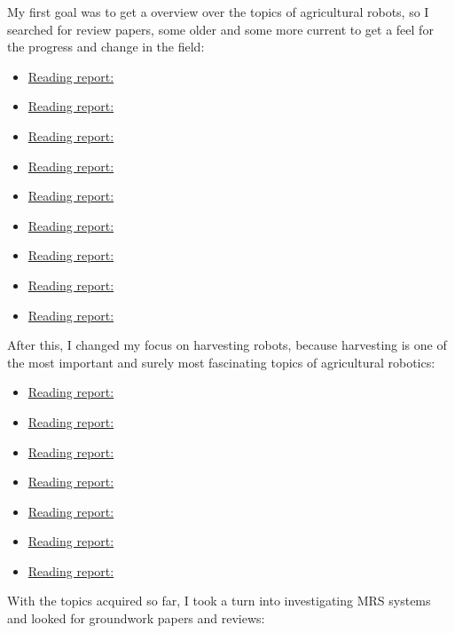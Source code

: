    My first goal was to get a overview over the topics of agricultural robots, so I searched for review papers, some older and some more current to get a feel for the progress and change in the field: 
    \begin{itemize}
        \item \hyperref[sec:Bac2014]{Reading report:} \cite{Bac2014}
        \item \hyperref[sec:Bechar2016]{Reading report:} \cite{Bechar2016}
        \item \hyperref[sec:Davidson2020]{Reading report:} \cite{Davidson2020}
        \item \hyperref[sec:Haidegger2013]{Reading report:} \cite{Haidegger2013}
        \item \hyperref[sec:Pedersen2006]{Reading report:} \cite{Pedersen2006}
        \item \hyperref[sec:Roldan2016]{Reading report:} \cite{Roldan2016}
        \item \hyperref[sec:Siciliano2016]{Reading report:} \cite{Siciliano2016}
        \item \hyperref[sec:Thorpe2001]{Reading report:} \cite{Thorpe2001}
        \item \hyperref[sec:Zhao2016]{Reading report:} \cite{Zhao2016}
    \end{itemize}
    After this, I changed my focus on harvesting robots, because harvesting is one of the most important and surely most fascinating topics of agricultural robotics: 
    \begin{itemize}
        \item \hyperref[sec:Arad2020]{Reading report:} \cite{Arad2020}
        \item \hyperref[sec:Henten2003]{Reading report:} \cite{Henten2003}
        \item \hyperref[sec:Herck2020]{Reading report:} \cite{Herck2020}
        \item \hyperref[sec:Lehnert2020]{Reading report:} \cite{Lehnert2020}
        \item \hyperref[sec:Lili2017]{Reading report:} \cite{Lili2017}
        \item \hyperref[sec:Wu2020]{Reading report:} \cite{Wu2020}
        \item \hyperref[sec:Weiss2011]{Reading report:} \cite{Weiss2011}
    \end{itemize}
    With the topics acquired so far, I took a turn into investigating MRS systems and looked for groundwork papers and reviews: 
